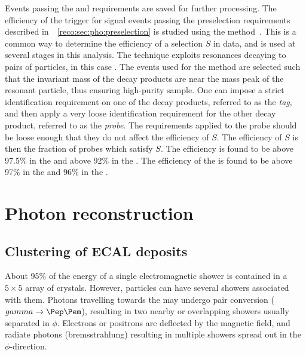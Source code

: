 Events passing the \LI and \HLT requirements are saved for further processing. The efficiency of the trigger for signal events passing the preselection requirements described in~\Sec~\ref{reco:sec:pho:preselection} is studied using the \TagAndProbe method~\cite{TagAndProbe}. This is a common way to determine the efficiency of a selection $S$ in data, and is used at several stages in this analysis. The technique exploits resonances decaying to pairs of particles, in this case \Zee. The events used for the \TagAndProbe method are selected such that the invariant mass of the decay products are near the mass peak of the resonant particle, thus ensuring high-purity sample. One can impose a strict identification requirement on one of the decay products, referred to as the \emph{tag}, and then apply a very loose identification requirement for the other decay product, referred to as the \emph{probe}. The requirements applied to the probe should be loose enough that they do not affect the efficiency of $S$. The efficiency of $S$ is then the fraction of probes which satisfy $S$. 
The \LI efficiency is found to be above 97.5\% in the \EB and above 92\% in the \EE. The efficiency of the \HLT is found to be above 97\% in the \EB and 96\% in the \EE. %


\section{Photon reconstruction} 
\label{reco:sec:photons}



\subsection{Clustering of ECAL deposits}

About 95\% of the energy of a single electromagnetic shower is contained in a $5\times5$ array of \ECAL crystals. However, particles can have several showers associated with them. Photons travelling towards the \ECAL may undergo pair conversion ($\gamma \rightarrow \Pep \Pem$), resulting in two nearby or overlapping showers usually separated in $\phi$. Electrons or positrons are deflected by the magnetic field, and radiate photons (bremsstrahlung) resulting in multiple showers spread out in the $\phi$-direction. 

